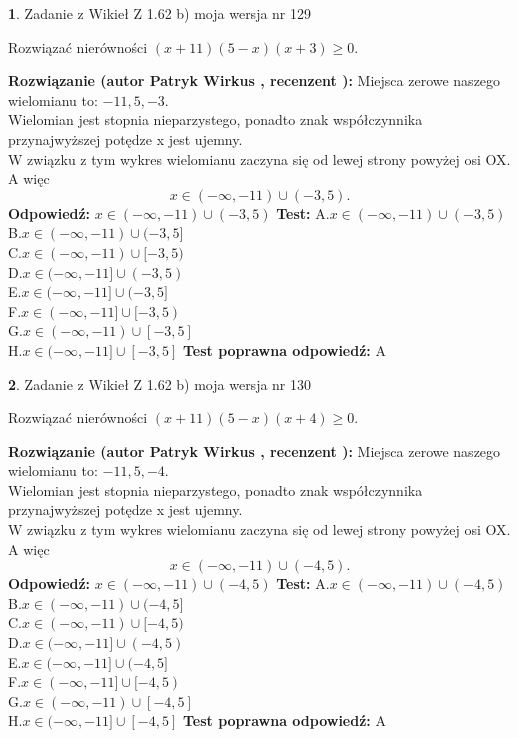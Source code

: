 \documentclass[12pt, a4paper]{article}
\theoremstyle{definition} %
\newtheorem{zad}{}
\newcommand{\zadStart}[1]{\begin{zad}#1\newline}
\newcommand{\zadStop}{\end{zad}}
\newcommand{\rozwStart}[2]{\noindent \textbf{Rozwiązanie (autor #1 , recenzent #2): }\newline}
\newcommand{\rozwStop}{\newline}
\newcommand{\odpStart}{\noindent \textbf{Odpowiedź:}\newline}
\newcommand{\odpStop}{\newline}
\newcommand{\testStart}{\noindent \textbf{Test:}\newline}
\newcommand{\testStop}{\newline}
\newcommand{\kluczStart}{\noindent \textbf{Test poprawna odpowiedź:}\newline}
\newcommand{\kluczStop}{\newline}
\begin{document}
\zadStart{Zadanie z Wikieł Z 1.62 b) moja wersja nr 129}

Rozwiązać nierówności $(x+11)(5-x)(x+3)\ge0$.
\zadStop
\rozwStart{Patryk Wirkus}{}
Miejsca zerowe naszego wielomianu to: $-11, 5, -3$.\\
Wielomian jest stopnia nieparzystego, ponadto znak współczynnika przy\linebreak najwyższej potędze x jest ujemny.\\ W związku z tym wykres wielomianu zaczyna się od lewej strony powyżej osi OX. A więc $$x \in (-\infty,-11) \cup (-3,5).$$
\rozwStop
\odpStart
$x \in (-\infty,-11) \cup (-3,5)$
\odpStop
\testStart
A.$x \in (-\infty,-11) \cup (-3,5)$\\
B.$x \in (-\infty,-11) \cup (-3,5]$\\
C.$x \in (-\infty,-11) \cup [-3,5)$\\
D.$x \in (-\infty,-11] \cup (-3,5)$\\
E.$x \in (-\infty,-11] \cup (-3,5]$\\
F.$x \in (-\infty,-11] \cup [-3,5)$\\
G.$x \in (-\infty,-11) \cup [-3,5]$\\
H.$x \in (-\infty,-11] \cup [-3,5]$
\testStop
\kluczStart
A
\kluczStop



\zadStart{Zadanie z Wikieł Z 1.62 b) moja wersja nr 130}

Rozwiązać nierówności $(x+11)(5-x)(x+4)\ge0$.
\zadStop
\rozwStart{Patryk Wirkus}{}
Miejsca zerowe naszego wielomianu to: $-11, 5, -4$.\\
Wielomian jest stopnia nieparzystego, ponadto znak współczynnika przy\linebreak najwyższej potędze x jest ujemny.\\ W związku z tym wykres wielomianu zaczyna się od lewej strony powyżej osi OX. A więc $$x \in (-\infty,-11) \cup (-4,5).$$
\rozwStop
\odpStart
$x \in (-\infty,-11) \cup (-4,5)$
\odpStop
\testStart
A.$x \in (-\infty,-11) \cup (-4,5)$\\
B.$x \in (-\infty,-11) \cup (-4,5]$\\
C.$x \in (-\infty,-11) \cup [-4,5)$\\
D.$x \in (-\infty,-11] \cup (-4,5)$\\
E.$x \in (-\infty,-11] \cup (-4,5]$\\
F.$x \in (-\infty,-11] \cup [-4,5)$\\
G.$x \in (-\infty,-11) \cup [-4,5]$\\
H.$x \in (-\infty,-11] \cup [-4,5]$
\testStop
\kluczStart
A
\kluczStop
\end{document}
